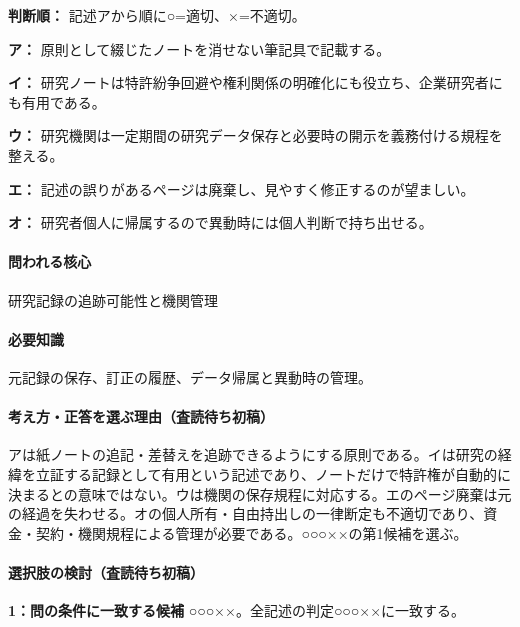 \noindent\textbf{判断順：} 記述アから順に○=適切、×=不適切。\par

\noindent\textbf{ア：} 原則として綴じたノートを消せない筆記具で記載する。\par

\noindent\textbf{イ：} 研究ノートは特許紛争回避や権利関係の明確化にも役立ち、企業研究者にも有用である。\par

\noindent\textbf{ウ：} 研究機関は一定期間の研究データ保存と必要時の開示を義務付ける規程を整える。\par

\noindent\textbf{エ：} 記述の誤りがあるページは廃棄し、見やすく修正するのが望ましい。\par

\noindent\textbf{オ：} 研究者個人に帰属するので異動時には個人判断で持ち出せる。\par

\paragraph{問われる核心} 研究記録の追跡可能性と機関管理

\paragraph{必要知識} 元記録の保存、訂正の履歴、データ帰属と異動時の管理。

\paragraph{考え方・正答を選ぶ理由（査読待ち初稿）} アは紙ノートの追記・差替えを追跡できるようにする原則である。イは研究の経緯を立証する記録として有用という記述であり、ノートだけで特許権が自動的に決まるとの意味ではない。ウは機関の保存規程に対応する。エのページ廃棄は元の経過を失わせる。オの個人所有・自由持出しの一律断定も不適切であり、資金・契約・機関規程による管理が必要である。○○○××の第1候補を選ぶ。

\paragraph{選択肢の検討（査読待ち初稿）}\mbox{}\par

\noindent\textbf{1：問の条件に一致する候補} ○○○××。全記述の判定○○○××に一致する。\par

